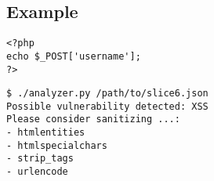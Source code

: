 \subsection*{Example}
\label{sec:experimental.example}

\begin{lstlisting}[label={php.slice06},
    title={slice6.php}]
<?php
echo $_POST['username'];
?>
\end{lstlisting}

\begin{lstlisting}[label={out.example.slice06},
        caption={Example output after running the analyser}]
$ ./analyzer.py /path/to/slice6.json
Possible vulnerability detected: XSS
Please consider sanitizing ...:
- htmlentities
- htmlspecialchars
- strip_tags
- urlencode
\end{lstlisting}
